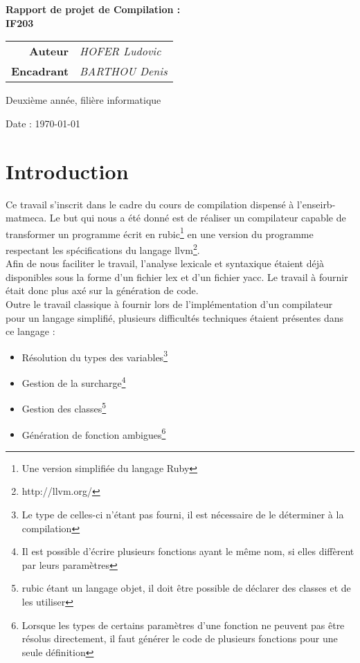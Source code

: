 \documentclass[12pt]{article}
\begin{document}
\thispagestyle{empty}


\begin{center}
	\Huge{\textbf{Rapport de projet de Compilation :\\IF203}}
\end{center}


\begin{tabular}{r@{:~}l}
	\textbf{Auteur} & \textit{HOFER Ludovic}\\
  \textbf{Encadrant} & \textit{BARTHOU Denis}\\
\end{tabular}


\begin{center}Deuxième année, filière informatique

	Date : \today
\end{center}

\newpage

\section{Introduction}
Ce travail s'inscrit dans le cadre du cours de compilation dispensé à
l'enseirb-matmeca. Le but qui nous a été donné est de réaliser un compilateur
capable de transformer un programme écrit en rubic\footnote{Une version
simplifiée du langage Ruby} en une version du programme respectant les
spécifications du langage llvm\footnote{http://llvm.org/}.\\

Afin de nous faciliter le travail, l'analyse lexicale et syntaxique étaient
déjà disponibles sous la forme d'un fichier lex et d'un fichier yacc. Le
travail à fournir était donc plus axé sur la génération de code.\\

Outre le travail classique à fournir lors de l'implémentation d'un
compilateur pour un langage simplifié, plusieurs difficultés techniques
étaient présentes dans ce langage :

\begin{itemize}
\item Résolution du types des variables\footnote{Le type de celles-ci
  n'étant pas fourni, il est nécessaire de le déterminer à la compilation}
\item Gestion de la surcharge\footnote{Il est possible d'écrire plusieurs
  fonctions ayant le même nom, si elles diffèrent par leurs paramètres}
\item Gestion des classes\footnote{rubic étant un langage objet,
  il doit être possible de déclarer des classes et de les utiliser}
\item Génération de fonction ambigues\footnote{Lorsque les types de certains
  paramètres d'une fonction ne peuvent pas être résolus directement, il faut
  générer le code de plusieurs fonctions pour une seule définition}
\end{itemize}
\end{document}
